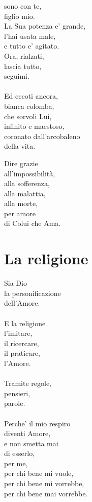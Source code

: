 \begin{haiku}
sono con te,\\
figlio mio.\\
La Sua potenza e' grande,\\
l'hai usata male,\\
e tutto e' agitato.\\
Ora, rialzati,\\
lascia tutto,\\
seguimi.\\
\leavevmode\\
Ed eccoti ancora,\\
bianca colomba,\\
che sorvoli Lui,\\
infinito e maestoso,\\
coronato dall'arcobaleno\\
della vita.\\
\end{haiku}

\begin{haiku}
    Dire grazie\\
all'impossibilità,\\
alla sofferenza,\\
alla malattia,\\
    alla morte,\\
per amore \\
di Colui che Ama.\\
\end{haiku}

\section{La religione}


\begin{haiku}
    Sia Dio\\
    la personificazione\\
    dell'Amore.\\
    \leavevmode\\
    E la religione\\
    l'imitare,\\
    il ricercare,\\
    il praticare,\\
    l'Amore.\\
    \leavevmode\\
    Tramite regole, \\
    pensieri,\\
    parole.\\
    \leavevmode\\
    Perche' il mio respiro\\
    diventi Amore,\\
    e non smetta mai\\
    di esserlo,\\
    per me,\\
    per chi bene mi vuole,\\
    per chi bene mi vorrebbe,\\
    per chi bene mai vorrebbe.\\\
\end{haiku}

